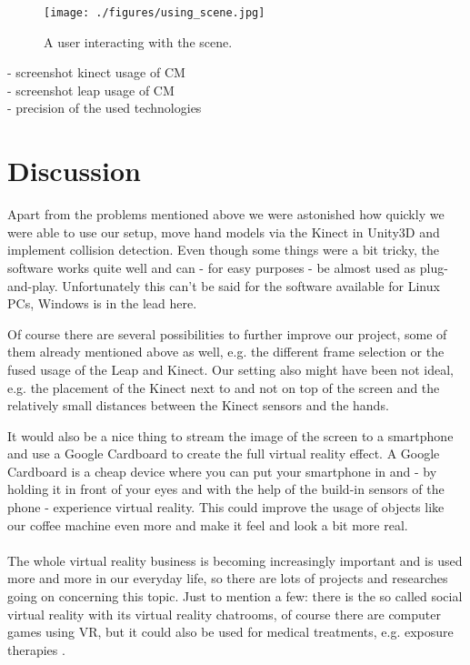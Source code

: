 \documentclass[11pt,a4paper,oldfontcommands, oneside]{memoir}
\begin{document}
\begin{figure}
\centering
\texttt{[image: ./figures/using\_scene.jpg]}
\caption{A user interacting with the scene.}
\end{figure}



- screenshot kinect usage of CM\\
- screenshot leap usage of CM\\
- precision of the used technologies\\


\chapter{Discussion}
Apart from the problems mentioned above we were astonished how quickly we were able to use our setup, move hand models via the Kinect in Unity3D and implement collision detection. Even though some things were a bit tricky, the software works quite well and can - for easy purposes - be almost used as plug-and-play.
Unfortunately this can't be said for the software available for Linux PCs, Windows is in the lead here. 


Of course there are several possibilities to further improve our project, some of them already mentioned above as well, e.g. the different frame selection or the fused usage of the Leap and Kinect.
Our setting also might have been not ideal, e.g. the placement of the Kinect next to and not on top of the screen and the relatively small distances between the Kinect sensors and the hands. 

It would also be a nice thing to stream the image of the screen to a smartphone and use a Google Cardboard to create the full virtual reality effect.
A  Google Cardboard is a cheap device where you can put your smartphone in and - by holding it in front of your eyes and with the help of the build-in sensors of the phone - experience virtual reality.
This could improve the usage of objects like our coffee machine even more and make it feel and look a bit more real.\\
\\
The whole virtual reality business is becoming increasingly important and is used more and more in our everyday life, so there are lots of projects and researches going on concerning this topic.
Just to mention a few: there is the so called social virtual reality with its virtual reality chatrooms, of course there are computer games using VR, but it could also be used for medical treatments, e.g. exposure therapies \cite{medicine}.
\end{document}
